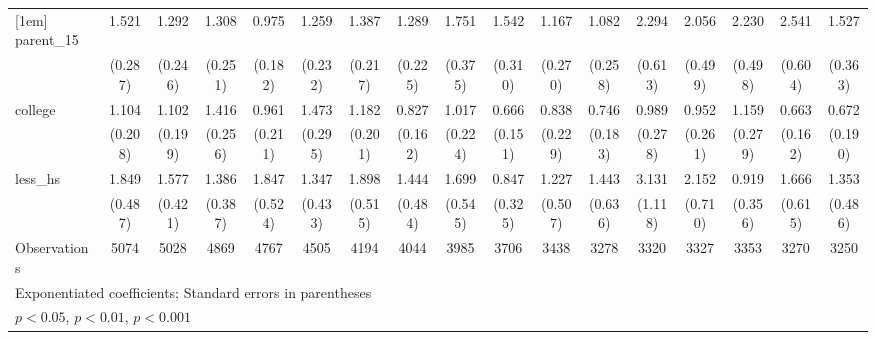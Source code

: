 {\begin{tabular}{l*{16}{c}}
[1em]
parent\_15           &       1.521\sym{*}  &       1.292         &       1.308         &       0.975         &       1.259         &       1.387\sym{*}  &       1.289         &       1.751\sym{**} &       1.542\sym{*}  &       1.167         &       1.082         &       2.294\sym{**} &       2.056\sym{**} &       2.230\sym{***}&       2.541\sym{***}&       1.527         \\
                    &     (0.287)         &     (0.246)         &     (0.251)         &     (0.182)         &     (0.232)         &     (0.217)         &     (0.225)         &     (0.375)         &     (0.310)         &     (0.270)         &     (0.258)         &     (0.613)         &     (0.499)         &     (0.498)         &     (0.604)         &     (0.363)         \\
[1em]
college             &       1.104         &       1.102         &       1.416         &       0.961         &       1.473         &       1.182         &       0.827         &       1.017         &       0.666         &       0.838         &       0.746         &       0.989         &       0.952         &       1.159         &       0.663         &       0.672         \\
                    &     (0.208)         &     (0.199)         &     (0.256)         &     (0.211)         &     (0.295)         &     (0.201)         &     (0.162)         &     (0.224)         &     (0.151)         &     (0.229)         &     (0.183)         &     (0.278)         &     (0.261)         &     (0.279)         &     (0.162)         &     (0.190)         \\
[1em]
less\_hs             &       1.849\sym{*}  &       1.577         &       1.386         &       1.847\sym{*}  &       1.347         &       1.898\sym{*}  &       1.444         &       1.699         &       0.847         &       1.227         &       1.443         &       3.131\sym{**} &       2.152\sym{*}  &       0.919         &       1.666         &       1.353         \\
                    &     (0.487)         &     (0.421)         &     (0.387)         &     (0.524)         &     (0.433)         &     (0.515)         &     (0.484)         &     (0.545)         &     (0.325)         &     (0.507)         &     (0.636)         &     (1.118)         &     (0.710)         &     (0.356)         &     (0.615)         &     (0.486)         \\
\hline
Observations        &        5074         &        5028         &        4869         &        4767         &        4505         &        4194         &        4044         &        3985         &        3706         &        3438         &        3278         &        3320         &        3327         &        3353         &        3270         &        3250         \\
\hline\hline
\multicolumn{17}{l}{\footnotesize Exponentiated coefficients; Standard errors in parentheses}\\
\multicolumn{17}{l}{\footnotesize \sym{*} \(p<0.05\), \sym{**} \(p<0.01\), \sym{***} \(p<0.001\)}\\
\end{tabular}
}

